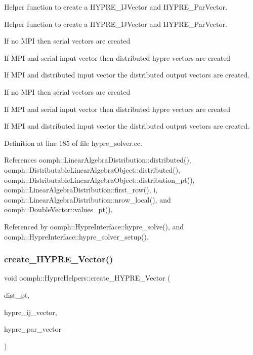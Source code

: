 Helper function to create a H\+Y\+P\+R\+E\+\_\+\+I\+J\+Vector and H\+Y\+P\+R\+E\+\_\+\+Par\+Vector. 

Helper function to create a H\+Y\+P\+R\+E\+\_\+\+I\+J\+Vector and H\+Y\+P\+R\+E\+\_\+\+Par\+Vector.
\begin{DoxyItemize}
\item If no M\+PI then serial vectors are created
\item If M\+PI and serial input vector then distributed hypre vectors are created
\item If M\+PI and distributed input vector the distributed output vectors are created.
\item If no M\+PI then serial vectors are created
\item If M\+PI and serial input vector then distributed hypre vectors are created
\item If M\+PI and distributed input vector the distributed output vectors are created. 
\end{DoxyItemize}

Definition at line 185 of file hypre\+\_\+solver.\+cc.



References oomph\+::\+Linear\+Algebra\+Distribution\+::distributed(), oomph\+::\+Distributable\+Linear\+Algebra\+Object\+::distributed(), oomph\+::\+Distributable\+Linear\+Algebra\+Object\+::distribution\+\_\+pt(), oomph\+::\+Linear\+Algebra\+Distribution\+::first\+\_\+row(), i, oomph\+::\+Linear\+Algebra\+Distribution\+::nrow\+\_\+local(), and oomph\+::\+Double\+Vector\+::values\+\_\+pt().



Referenced by oomph\+::\+Hypre\+Interface\+::hypre\+\_\+solve(), and oomph\+::\+Hypre\+Interface\+::hypre\+\_\+solver\+\_\+setup().

\mbox{\label{namespaceoomph_1_1HypreHelpers_a1954ae1f68448b32a57816f65c478481}} 
\subsubsection{\texorpdfstring{create\+\_\+\+H\+Y\+P\+R\+E\+\_\+\+Vector()}{create\_HYPRE\_Vector()}\hspace{0.1cm}{\footnotesize\ttfamily [2/2]}}
{\footnotesize\ttfamily void oomph\+::\+Hypre\+Helpers\+::create\+\_\+\+H\+Y\+P\+R\+E\+\_\+\+Vector (\begin{DoxyParamCaption}\item[{const \hyperlink{classoomph_1_1LinearAlgebraDistribution}{Linear\+Algebra\+Distribution} $\ast$}]{dist\+\_\+pt,  }\item[{H\+Y\+P\+R\+E\+\_\+\+I\+J\+Vector \&}]{hypre\+\_\+ij\+\_\+vector,  }\item[{H\+Y\+P\+R\+E\+\_\+\+Par\+Vector \&}]{hypre\+\_\+par\+\_\+vector }\end{DoxyParamCaption})}



